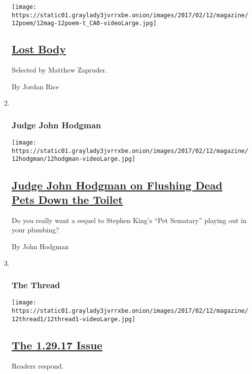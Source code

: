 \begin{enumerate}
  \texttt{[image: https://static01.graylady3jvrrxbe.onion/images/2017/02/12/magazine/12poem/12mag-12poem-t\_CA0-videoLarge.jpg]}

  \hypertarget{lost-body}{%
  \subsection{\texorpdfstring{\href{/2017/02/10/magazine/lost-body.html}{Lost
  Body}}{Lost Body}}\label{lost-body}}

  Selected by Matthew Zapruder.

  By Jordan Rice
\item ~
  \hypertarget{judge-john-hodgman}{%
  \subsubsection{Judge John Hodgman}\label{judge-john-hodgman}}

  \texttt{[image: https://static01.graylady3jvrrxbe.onion/images/2017/02/12/magazine/12hodgman/12hodgman-videoLarge.jpg]}

  \hypertarget{judge-john-hodgman-on-flushing-dead-pets-down-the-toilet}{%
  \subsection{\texorpdfstring{\href{/2017/02/10/magazine/judge-john-hodgman-on-flushing-dead-pets-down-the-toilet.html}{Judge
  John Hodgman on Flushing Dead Pets Down the
  Toilet}}{Judge John Hodgman on Flushing Dead Pets Down the Toilet}}\label{judge-john-hodgman-on-flushing-dead-pets-down-the-toilet}}

  Do you really want a sequel to Stephen King's ``Pet Sematary'' playing
  out in your plumbing?

  By John Hodgman
\item ~
  \hypertarget{the-thread}{%
  \subsubsection{The Thread}\label{the-thread}}

  \texttt{[image: https://static01.graylady3jvrrxbe.onion/images/2017/02/12/magazine/12thread1/12thread1-videoLarge.jpg]}

  \hypertarget{the-12917-issue}{%
  \subsection{\texorpdfstring{\href{/2017/02/10/magazine/the-1-29-17-issue.html}{The
  1.29.17 Issue}}{The 1.29.17 Issue}}\label{the-12917-issue}}

  Readers respond.
\end{enumerate}

